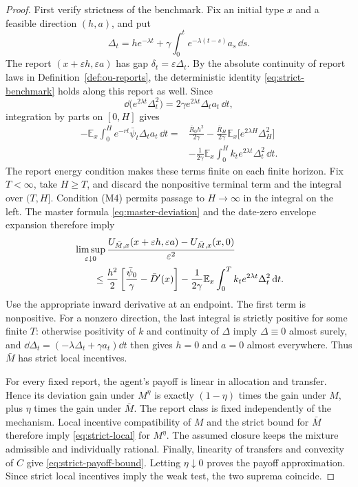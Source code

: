 \documentclass[12pt]{article}
\newcommand{\E}{\mathbb{E}}
\begin{document}
\begin{proof}
First verify strictness of the benchmark. Fix an initial type \(x\)
and a feasible direction \((h,a)\), and put
\[
  \Delta_t=h e^{-\lambda t}
    +\gamma\int_0^t e^{-\lambda(t-s)}a_s\,\dd s.
\]
The report \((x+\varepsilon h,\varepsilon a)\) has gap
\(\delta_t=\varepsilon\Delta_t\). By the absolute continuity of
report laws in Definition~\ref{def:ou-reports}, the deterministic
identity \eqref{eq:strict-benchmark} holds along this report as well.
Since
\[
  \dd\bigl(e^{2\lambda t}\Delta_t^2\bigr)
  =2\gamma e^{2\lambda t}\Delta_ta_t\,\dd t,
\]
integration by parts on \([0,H]\) gives
\begin{align*}
  -\E_x\int_0^H e^{-rt}\bar\psi_t\Delta_ta_t\,\dd t
  ={}&\frac{\bar R_0h^2}{2\gamma}
    -\frac{\bar R_H}{2\gamma}
       \E_x\bigl[e^{2\lambda H}\Delta_H^2\bigr]\\
    &-\frac{1}{2\gamma}\E_x\int_0^H
        k_t e^{2\lambda t}\Delta_t^2\,\dd t.
\end{align*}
The report energy condition makes these terms finite on each finite
horizon. Fix \(T<\infty\), take \(H\geq T\), and discard the
nonpositive terminal term and the integral over \((T,H]\).
Condition (M4) permits passage to \(H\to\infty\) in the integral
on the left. The master formula \eqref{eq:master-deviation} and the
date-zero envelope expansion therefore imply
\begin{align}
  &\limsup_{\varepsilon\downarrow0}
    \frac{U_{\bar M,x}(x+\varepsilon h,\varepsilon a)
          -U_{\bar M,x}(x,0)}{\varepsilon^2}
       \notag\\
  &\qquad\leq
    \frac{h^2}{2}
       \left[\frac{\bar\psi_0}{\gamma}-\bar D'(x)\right]
    -\frac{1}{2\gamma}\E_x\int_0^T
       k_t e^{2\lambda t}\Delta_t^2\,\dd t.
  \label{eq:strict-ou-bound}
\end{align}
Use the appropriate inward derivative at an endpoint. The first
term is nonpositive. For a nonzero direction, the last integral is
strictly positive for some finite \(T\): otherwise positivity of
\(k\) and continuity of \(\Delta\) imply \(\Delta\equiv0\)
almost surely, and
\(\dd\Delta_t=(-\lambda\Delta_t+\gamma a_t)\dd t\) then gives
\(h=0\) and \(a=0\) almost everywhere. Thus \(\bar M\) has strict
local incentives.

For every fixed report, the agent's payoff is linear in allocation
and transfer. Hence its deviation gain under \(M^\eta\) is exactly
\((1-\eta)\) times the gain under \(M\), plus \(\eta\) times the
gain under \(\bar M\). The report class is fixed independently of
the mechanism. Local incentive compatibility of \(M\) and the
strict bound for \(\bar M\) therefore imply
\eqref{eq:strict-local} for \(M^\eta\). The assumed closure keeps
the mixture admissible and individually rational. Finally, linearity
of transfers and convexity of \(C\) give
\eqref{eq:strict-payoff-bound}. Letting \(\eta\downarrow0\)
proves the payoff approximation. Since strict local incentives imply
the weak test, the two suprema coincide.
\end{proof}
\end{document}
